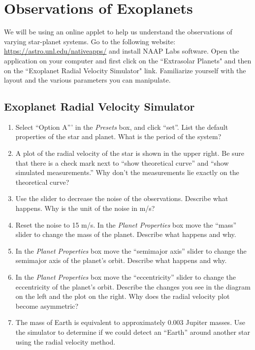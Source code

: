 \documentclass[12pt]{article}%
\begin{document}
\section{Observations of Exoplanets} 

We will be using an online applet to help us understand the observations of varying star-planet systems.  
Go to the following website: \url{https://astro.unl.edu/nativeapps/} and install NAAP Labs software. 
Open the application on your computer and  first click on the ``Extrasolar Planets" and then on the ``Exoplanet Radial Velocity Simulator" link. Familiarize yourself with the layout and the various parameters you can manipulate.

\subsection{Exoplanet Radial Velocity Simulator}

\begin{enumerate}
\item Select ``Option A''' in the \textit{Presets} box, and click ``set''. 
List the default properties of the star and planet.  What is the period of the system?
\item A plot of the radial velocity of the star is shown in the upper right.  Be sure that there is a check mark next to ``show theoretical curve'' and ``show simulated measurements.''  
Why don't the measurements lie exactly on the theoretical curve?
\item Use the slider to decrease the noise of the observations.  
Describe what happens. Why is the unit of the noise in m/s?
\item Reset the noise to 15 m/s. In the \textit{Planet Properties} box move the ``mass'' slider to change the mass of the planet.  Describe what happens and why.
\item In the \textit{Planet Properties} box move the ``semimajor axis'' slider to change the semimajor axis of the planet's orbit.  
Describe what happens and why.
\item In the \textit{Planet Properties} box move the ``eccentricity'' slider to change the eccentricity of the planet's orbit.  Describe the changes you see in the diagram on the left and the plot on the right. Why does the radial velocity plot become asymmetric?
\item The mass of Earth is equivalent to approximately 0.003 Jupiter masses.  
Use the simulator to determine if we could detect an ``Earth'' around another star using the radial velocity method.
\end{enumerate}
\end{document}
